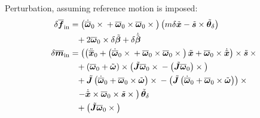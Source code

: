 \documentclass[10pt,fleqn,subeqn]{report}
\newcommand{\T}[1]{\bm{#1}}
\newcommand{\TT}[1]{\bm{#1}}
\begin{document}
Perturbation, assuming reference motion is imposed:
\begin{subequations}
\begin{align}
	\delta\overline{\T{f}}_{\text{in}}
	&= \plbr{
		\dot{\overline{\T{\omega}}}_0 \times{}
		+ \overline{\T{\omega}}_0 \times \overline{\T{\omega}}_0 \times{}
	} \plbr{
		m \delta\tilde{\T{x}}
		- \tilde{\T{s}} \times \tilde{\T{\theta}}_{\delta}
	}
	\noindent \\
	&\hphantom{=}+ 2 \overline{\T{\omega}}_0 \times \delta\tilde{\T{\beta}}
	+ \delta \dot{\tilde{\T{\beta}}} \\
%
	\delta\overline{\T{m}}_{\text{in}}
	&= \lplbr{
		\plbr{
			\ddot{\overline{\T{x}}}_0
			+ \plbr{
				\dot{\overline{\T{\omega}}}_0 \times{}
				+ \overline{\T{\omega}}_0 \times \overline{\T{\omega}}_0 \times{}
			} \tilde{\T{x}}
			+ \overline{\T{\omega}}_0 \times \dot{\tilde{\T{x}}}
		} \times \tilde{\T{s}} \times{}
	} \nonumber \\
	&\hphantom{=}
		+ \plbr{
			\overline{\T{\omega}}_0
			+ \tilde{\T{\omega}}
		} \times \plbr{
			\tilde{\TT{J}} \overline{\T{\omega}}_0 \times{}
			- \plbr{\tilde{\TT{J}} \overline{\T{\omega}}_0} \times{}
		}
	\nonumber \\
	&\hphantom{=}
		+ \tilde{\TT{J}} \plbr{
			\dot{\overline{\T{\omega}}}_0
			+ \overline{\T{\omega}}_0 \times \tilde{\T{\omega}}
		} \times{}
		- \plbr{\tilde{\TT{J}} \plbr{
			\dot{\overline{\T{\omega}}}_0
			+ \overline{\T{\omega}}_0 \times \tilde{\T{\omega}}
		}} \times{}
	\nonumber \\
	&\hphantom{=}
	\rplbr{
		- \dot{\tilde{\T{x}}} \times \overline{\T{\omega}}_0 \times \tilde{\T{s}} \times{}
	} \tilde{\T{\theta}}_{\delta}
	\nonumber \\
	&\hphantom{=}
	+ \plbr{
		\tilde{\TT{J}} \overline{\T{\omega}}_0 \times{}
}
\end{align}
\end{subequations}
\end{document}
